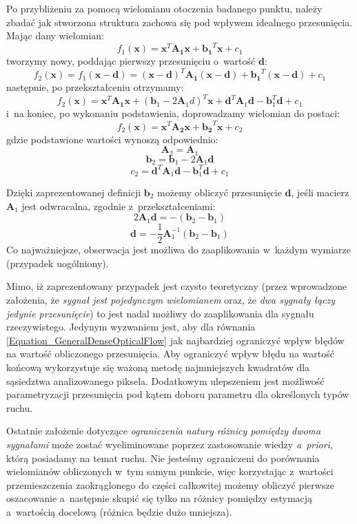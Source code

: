     Po przybliżeniu za pomocą wielomianu otoczenia badanego punktu, należy zbadać jak stworzona struktura zachowa się pod wpływem idealnego przesunięcia. Mając dany wielomian: \[ f_{1}(\mathbf{x}) = \mathbf{x}^{T}\mathbf{A_{1}}\mathbf{x} + \mathbf{b_{1}}^{T}\mathbf{x} + c_{1} \] tworzymy nowy, poddając pierwszy przesunięciu o~wartość $\mathbf{d}$: \[
      f_{2}(\mathbf{x}) = f_{1}(\mathbf{x-d}) = (\mathbf{x-d})^{T}\mathbf{A_{1}}(\mathbf{x-d}) + \mathbf{b_{1}}^{T}(\mathbf{x-d}) + c_{1}
    \] następnie, po przekształceniu otrzymamy: \[
        f_{2}(\mathbf{x}) = \mathbf{x}^{T}\mathbf{A_{1}}\mathbf{x} + (\mathbf{b}_{1} - 2\mathbf{A}_{1}d)^{T}\mathbf{x} + \mathbf{d}^{T}\mathbf{A}_{1}\mathbf{d} - \mathbf{b}_{1}^{T}\mathbf{d} + c_{1}
    \] i~na koniec, po wykonaniu podstawienia, doprowadzamy wielomian do postaci: \[
        f_{2}(\mathbf{x}) = \mathbf{x}^{T}\mathbf{A_{2}}\mathbf{x} + \mathbf{b_{2}}^{T}\mathbf{x} + c_{2}
    \] gdzie podstawione wartości wynoszą odpowiednio:
    \[ \mathbf{A}_{2} = \mathbf{A}_{1} \]
    \[ \mathbf{b}_{2} = \mathbf{b}_{1} - 2\mathbf{A}_{1}\mathbf{d} \]
    \[ c_{2} = \mathbf{d}^{T}\mathbf{A}_{1}\mathbf{d} - \mathbf{b}_{1}^{T}\mathbf{d} + c_{1} \]

    Dzięki zaprezentowanej definicji $\mathbf{b}_{2}$ możemy obliczyć przesunięcie $\mathbf{d}$, jeśli macierz $\mathbf{A}_{1}$ jest odwracalna, zgodnie z~przekształceniami:
    \begin{equation}\label{Equation_GeneralDenseOpticalFlow}
      2\mathbf{A}_{1}\mathbf{d} = -(\mathbf{b}_{2} - \mathbf{b}_{1})
    \end{equation}
    \[ \mathbf{d} = -\frac{1}{2}\mathbf{A}_{1}^{-1}(\mathbf{b}_{2} - \mathbf{b}_{1}) \]
    Co najważniejsze, obserwacja jest możliwa do zaaplikowania w~każdym wymiarze (przypadek uogólniony).

    Mimo, iż zaprezentowany przypadek jest czysto teoretyczny (przez wprowadzone założenia, że \textit{sygnał jest pojedynczym wielomianem} oraz, że \textit{dwa sygnały łączy jedynie przesunięcie}) to jest nadal możliwy do zaaplikowania dla sygnału rzeczywistego. Jedynym wyzwaniem jest, aby dla równania \ref{Equation_GeneralDenseOpticalFlow} jak najbardziej ograniczyć wpływ błędów na wartość obliczonego przesunięcia. Aby ograniczyć wpływ błędu na wartość końcową wykorzystuje się ważoną metodę najmniejszych kwadratów dla sąsiedztwa analizowanego piksela. Dodatkowym ulepszeniem jest możliwość parametryzacji przesunięcia pod kątem doboru parametru dla określonych typów ruchu.

    Ostatnie założenie dotyczące \textit{ograniczenia natury różnicy pomiędzy dwoma sygnałami} może zostać wyeliminowane poprzez zastosowanie wiedzy \textit{a~priori}, którą posiadamy na temat ruchu. Nie jesteśmy ograniczeni do porównania wielomianów obliczonych w~tym samym punkcie, więc korzystając z~wartości przemieszczenia zaokrąglonego do części całkowitej możemy obliczyć pierwsze oszacowanie a~następnie skupić się tylko na różnicy pomiędzy estymacją a~wartością docelową (różnica będzie dużo mniejsza).

